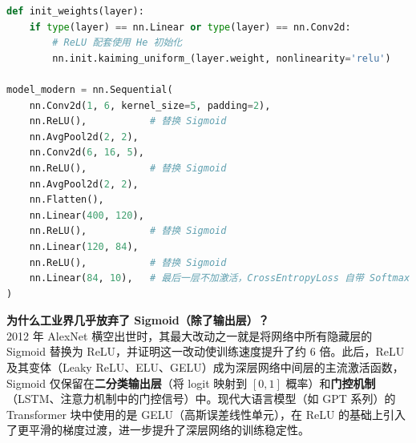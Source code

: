 \documentclass[a4paper,11pt]{ctexart}
\begin{document}
\begin{solutionbox}[参考答案与详细解析]
    \begin{keybox}
        \begin{lstlisting}[language=Python]
def init_weights(layer):
    if type(layer) == nn.Linear or type(layer) == nn.Conv2d:
        # ReLU 配套使用 He 初始化
        nn.init.kaiming_uniform_(layer.weight, nonlinearity='relu')

model_modern = nn.Sequential(
    nn.Conv2d(1, 6, kernel_size=5, padding=2),
    nn.ReLU(),           # 替换 Sigmoid
    nn.AvgPool2d(2, 2),
    nn.Conv2d(6, 16, 5),
    nn.ReLU(),           # 替换 Sigmoid
    nn.AvgPool2d(2, 2),
    nn.Flatten(),
    nn.Linear(400, 120),
    nn.ReLU(),           # 替换 Sigmoid
    nn.Linear(120, 84),
    nn.ReLU(),           # 替换 Sigmoid
    nn.Linear(84, 10),   # 最后一层不加激活，CrossEntropyLoss 自带 Softmax
)
        \end{lstlisting}
    \end{keybox}
\end{solutionbox}

\begin{appbox}[现实应用场景]
    \textbf{为什么工业界几乎放弃了 Sigmoid（除了输出层）？}\\
    2012 年 AlexNet 横空出世时，其最大改动之一就是将网络中所有隐藏层的 Sigmoid 替换为 ReLU，并证明这一改动使训练速度提升了约 6 倍。此后，ReLU 及其变体（Leaky ReLU、ELU、GELU）成为深层网络中间层的主流激活函数，Sigmoid 仅保留在\textbf{二分类输出层}（将 logit 映射到 $[0,1]$ 概率）和\textbf{门控机制}（LSTM、注意力机制中的门控信号）中。现代大语言模型（如 GPT 系列）的 Transformer 块中使用的是 GELU（高斯误差线性单元），在 ReLU 的基础上引入了更平滑的梯度过渡，进一步提升了深层网络的训练稳定性。
\end{appbox}
\end{document}
